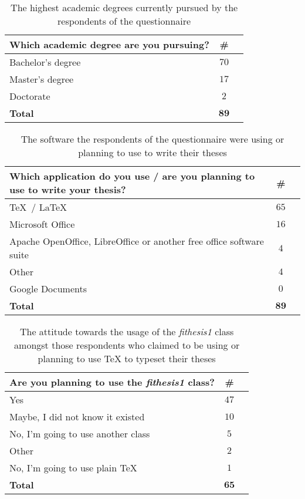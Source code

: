 \documentclass[12pt]{article}
\def\pkg#1{{\sf#1}}
\let\pkg\emph
\begin{document}
\begin{frame}[c]
  \begin{table}[!b]
    \begin{tabularx}{\textwidth}{Xcr}
      \textbf{Which academic degree are you pursuing?} &
      \textbf{\#} \\
      \toprule
      Bachelor's degree  & $70$ \\
      Master's degree    & $17$ \\
      Doctorate          & $2$  \\
      \bottomrule
      \textbf{Total}     & $\mathbf{89}$
    \end{tabularx}
    \caption{The highest academic degrees currently pursued by the
      respondents of the questionnaire}
  \end{table}
\end{frame}
\begin{frame}
  \begin{table}[!b]
    \begin{tabularx}{\textwidth}{Xcr}
      \textbf{Which application do you use / are you planning to
      use to write your thesis?} & \textbf{\#} \\
      \toprule
      \TeX\ / \LaTeX          & $65$          \\
      Microsoft Office        & $16$          \\
      Apache OpenOffice, LibreOffice or another free office
      software suite          & $4$           \\
      Other                   & $4$           \\
      Google Documents        & $0$           \\
      \bottomrule
      \textbf{Total}          & $\mathbf{89}$ 
    \end{tabularx}
    \caption{The software the respondents of the questionnaire
      were using or planning to use to write their theses}
  \end{table}
\end{frame}
\begin{frame}
  \begin{table}[!b]
    \begin{tabularx}{\textwidth}{Xcr}
      \textbf{Are you planning to use the \pkg{fithesis1}
        class?} & \textbf{\#} \\
      \toprule    Yes                       & $47$
      \\ Maybe, I did not know it existed   & $10$
      \\ No, I'm going to use another class & $5$
      \\ Other                              & $2$
      \\ No, I'm going to use plain \TeX{}  & $1$
      \\ \bottomrule
      \textbf{Total}  & $\mathbf{65}$ 
    \end{tabularx}
      \caption{The attitude towards the usage of the \pkg{fithesis1}
      class amongst those respondents who claimed to be using or
      planning to use \TeX{} to typeset their theses}
  \end{table}
\end{frame}\FloatBarrier
\end{document}
